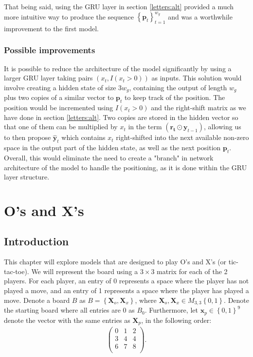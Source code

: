 \documentclass{somasmsc}
\begin{document}
That being said, using the GRU layer in section \ref{letters:alt} provided a much more intuitive way to produce the sequence $\left\{\pmb{p}_t\right\}_{t=1}^{w_g}$ and was a worthwhile improvement to the first model.

\subsection{Possible improvements}

It is possible to reduce the architecture of the model significantly by using a larger GRU layer taking pairs $\left(x_t, I\left(x_t > 0\right)\right)$ as inputs. This solution would involve creating a hidden state of size $3w_g$, containing the output of length $w_g$ plus two copies of a similar vector to $\pmb{p}_t$ to keep track of the position. The position would be incremented using $I\left(x_t > 0\right)$ and the right-shift matrix as we have done in section \ref{letters:alt}. Two copies are stored in the hidden vector so that one of them can be multiplied by $x_t$ in the term $\left(\pmb{r_t} \odot \pmb{y}_{t-1}\right)$, allowing us to then propose $\hat{\pmb{y}}_{t}$ which contains $x_t$ right-shifted into the next available non-zero space in the output part of the hidden state, as well as the next position $\pmb{p}_t$. Overall, this would eliminate the need to create a "branch" in network architecture of the model to handle the positioning, as it is done within the GRU layer structure.


\chapter{O's and X's}

\section{Introduction}

This chapter will explore models that are designed to play O's and X's (or tic-tac-toe). We will represent the board using a $3 \times 3$ matrix for each of the 2 players. For each player, an entry of 0 represents a space where the player has not played a move, and an entry of 1 represents a space where the player has played a move. Denote a board $B$ as $B = \left\{\mathbf{X}_o, \mathbf{X}_x\right\}$, where $\mathbf{X}_o, \mathbf{X}_x \in M_{3,3}\left\{0,1\right\}$. Denote the starting board where all entries are 0 as $B_0$. Furthermore, let $\pmb{x}_p \in \left\{0,1\right\}^9$ denote the vector with the same entries as $\mathbf{X}_p$, in the following order:
\begin{align*}
    \begin{pmatrix}
        0 & 1 & 2 \\
        3 & 4 & 4 \\
        6 & 7 & 8 \\
    \end{pmatrix}.
\end{align*}
\end{document}
